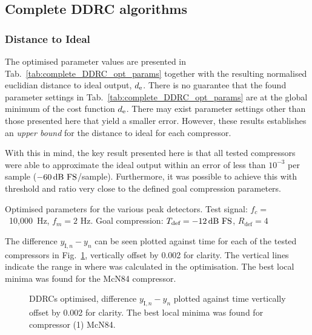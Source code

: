 \documentclass[../main2.tex]{subfiles}
\providecommand{\rootdir}{..}
\begin{document}
\subsection{Complete DDRC algorithms}

\subsubsection{Distance to Ideal}
The optimised parameter values are presented in Tab.~\ref{tab:complete_DDRC_opt_params} together with the resulting normalised euclidian distance to ideal output, $d_\text{e}$. There is no guarantee that the found parameter settings in Tab.~\ref{tab:complete_DDRC_opt_params} are at the global minimum of the cost function $d_\text{e}$. There may exist parameter settings other than those presented here that yield a smaller error. However, these results establishes an \emph{upper bound} for the distance to ideal for each compressor.

With this in mind, the key result presented here is that all tested compressors were able to approximate the ideal output within an error of less than $10^{-3}$ per sample ($-60 \mskip3mu\text{dB FS}$/sample). Furthermore, it was possible to achieve this with threshold and ratio very close to the defined goal compression parameters.

\begin{table}[h]
\small
\begin{center}
\caption{Optimised parameters for the various peak detectors. Test signal: $f_c=$~10,000~Hz, $f_m=2$ Hz. Goal compression: $T_\text{def}=-12 \mskip3mu\text{dB FS}$, $R_\text{def}=4$}
\label{tab:complete_DDRC_opt_params}

\end{center}
\end{table}

The difference $y_{\text{I},n} - y_n$ can be seen plotted against time for each of the tested compressors in Fig.~\ref{fig:complete_DDRC_opt_diff}, vertically offset by 0.002 for clarity. The vertical lines indicate the range in where \EN was calculated in the optimisation. The best local minima was found for the McN84 compressor.

\begin{figure}[h]
\centerline{}
\caption{DDRCs optimised, difference $y_{\text{I},n} - y_n$ plotted against time vertically offset by 0.002 for clarity. The best local minima was found for compressor (1) McN84.}
\label{fig:complete_DDRC_opt_diff}
\end{figure}
\end{document}
